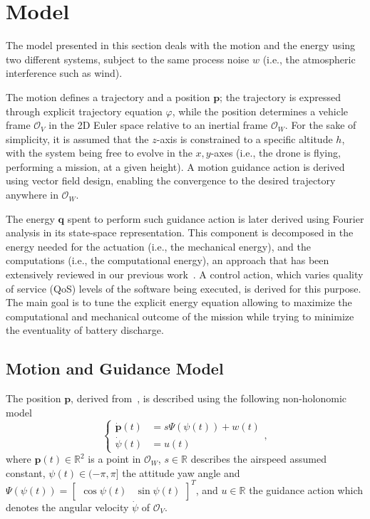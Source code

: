 \documentclass[letterpaper,10pt,conference]{ieeeconf}
\begin{document}
\section{Model}
\label{sec:estimation}

The model presented in this section deals with the motion and the energy using two different systems, subject to the same process noise $w$ (i.e., the atmospheric interference such as wind). 

The motion defines a trajectory and a position $\mathbf{p}$; the trajectory is expressed through explicit trajectory equation $\varphi$, while the position determines a vehicle frame $\mathcal{O}_V$ in the 2D Euler space relative to an inertial frame $\mathcal{O}_W$. For the sake of simplicity, it is assumed that the $z$-axis is constrained to a specific altitude $h$, with the system being free to evolve in the $x,y$-axes (i.e., the drone is flying, performing a mission, at a given height). A motion guidance action is derived using vector field design, enabling the convergence to the desired trajectory anywhere in $\mathcal{O}_W$. 

The energy $\mathbf{q}$ spent to perform such guidance action is later derived using Fourier analysis in its state-space representation. This component is decomposed in the energy needed for the actuation (i.e., the mechanical energy), and the computations (i.e., the computational energy), an approach that has been extensively reviewed in our previous work~\cite{seewald2019coarse, seewald2019component, seewald2020mechanical}. A control action, which varies quality of service (QoS) levels of the software being executed, is derived for this purpose. The main goal is to tune the explicit energy equation allowing to maximize the computational and mechanical outcome of the mission while trying to minimize the eventuality of battery discharge.

\subsection{Motion and Guidance Model}
The position $\mathbf{p}$, derived from~\cite{de2017guidance}, is described using the following non-holonomic model
\begin{equation}\label{eqq:1}\begin{cases}
  \dot{\mathbf{p}}(t)&=s\Psi(\psi(t))+w(t)\\
  \dot{\psi}(t)&=u(t)
\end{cases},
\end{equation}
where $\mathbf{p}(t)\in\mathbb{R}^2$ is a point in $\mathcal{O}_W$, $s\in\mathbb{R}$ describes the airspeed assumed constant, $\psi(t)\in(-\pi,\pi]$ the attitude yaw angle and $\Psi(\psi(t))=\begin{bmatrix}\cos{\psi(t)} & \sin{\psi(t)}\end{bmatrix}^T$, and $u\in\mathbb{R}$ the guidance action which denotes the angular velocity $\dot{\psi}$ of $\mathcal{O}_V$.
\end{document}

